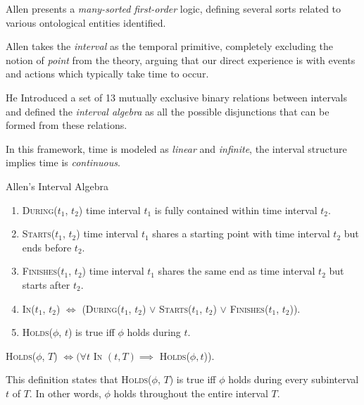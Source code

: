 Allen presents a \textit{many-sorted} \textit{first-order} logic, defining several sorts related to various ontological entities identified.

Allen takes the \textit{interval} as the temporal primitive, completely excluding the notion of \textit{point} from the theory, arguing that our direct experience
is with events and actions which typically take time to occur.

He Introduced a set of 13 mutually exclusive binary relations between intervals and
defined the \textit{interval algebra} as all the possible disjunctions that can be formed from these relations.

In this framework, time is modeled as \textit{linear} and \textit{infinite}, the interval structure implies time is \textit{continuous}.

\begin{exmp} Allen's Interval Algebra

	\begin{enumerate}
		\item \textsc{During}($t_1$, $t_2$) time interval $t_1$ is fully contained within time interval $t_2$.

		\item \textsc{Starts}($t_1$, $t_2$) time interval $t_1$ shares a starting point with time interval $t_2$ but ends before $t_2$.

		\item \textsc{Finishes}($t_1$, $t_2$) time interval $t_1$ shares the same end as time interval $t_2$ but starts after $t_2$.

		\item \textsc{In}($t_1$, $t_2$) $\iff$ (\textsc{During}($t_1$, $t_2$) $\lor$ \textsc{Starts}($t_1$, $t_2$) $\lor$ \textsc{Finishes}($t_1$, $t_2$)).

		\item \textsc{Holds}(\(\phi\), \(t\)) is true iff \(\phi\) holds during \(t\).
	\end{enumerate}



	\begin{center}
		\textsc{Holds}(\(\phi\), \(T\)) \(\iff ( \forall t \) \textsc{In} $ (t,T) \implies $ \textsc{Holds}($\phi, t$)).
	\end{center}

	This definition states that \textsc{Holds}($\phi$, $T$) is true iff $\phi$ holds during every subinterval $t$ of $T$. In other words, $\phi$ holds throughout the entire interval $T$.
\end{exmp}

